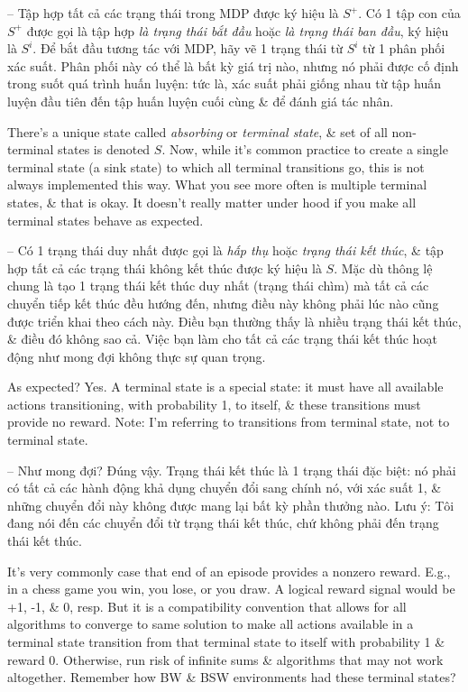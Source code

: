 \documentclass{article}
\begin{document}
\begin{itemize}
\begin{itemize}
        -- Tập hợp tất cả các trạng thái trong MDP được ký hiệu là $S^+$. Có 1 tập con của $S^+$ được gọi là tập hợp {\it là trạng thái bắt đầu} hoặc {\it là trạng thái ban đầu}, ký hiệu là $S^i$. Để bắt đầu tương tác với MDP, hãy vẽ 1 trạng thái từ $S^i$ từ 1 phân phối xác suất. Phân phối này có thể là bất kỳ giá trị nào, nhưng nó phải được cố định trong suốt quá trình huấn luyện: tức là, xác suất phải giống nhau từ tập huấn luyện đầu tiên đến tập huấn luyện cuối cùng \& để đánh giá tác nhân.

        There's a unique state called {\it absorbing} or {\it terminal state}, \& set of all non-terminal states is denoted $S$. Now, while it's common practice to create a single terminal state (a sink state) to which all terminal transitions go, this is not always implemented this way. What you see more often is multiple terminal states, \& that is okay. It doesn't really matter under hood if you make all terminal states behave as expected.

        -- Có 1 trạng thái duy nhất được gọi là {\it hấp thụ} hoặc {\it trạng thái kết thúc}, \& tập hợp tất cả các trạng thái không kết thúc được ký hiệu là $S$. Mặc dù thông lệ chung là tạo 1 trạng thái kết thúc duy nhất (trạng thái chìm) mà tất cả các chuyển tiếp kết thúc đều hướng đến, nhưng điều này không phải lúc nào cũng được triển khai theo cách này. Điều bạn thường thấy là nhiều trạng thái kết thúc, \& điều đó không sao cả. Việc bạn làm cho tất cả các trạng thái kết thúc hoạt động như mong đợi không thực sự quan trọng.

        As expected? Yes. A terminal state is a special state: it must have all available actions transitioning, with probability 1, to itself, \& these transitions must provide no reward. Note: I'm referring to transitions from terminal state, not to terminal state.

        -- Như mong đợi? Đúng vậy. Trạng thái kết thúc là 1 trạng thái đặc biệt: nó phải có tất cả các hành động khả dụng chuyển đổi sang chính nó, với xác suất 1, \& những chuyển đổi này không được mang lại bất kỳ phần thưởng nào. Lưu ý: Tôi đang nói đến các chuyển đổi từ trạng thái kết thúc, chứ không phải đến trạng thái kết thúc.

        It's very commonly case that end of an episode provides a nonzero reward. E.g., in a chess game you win, you lose, or you draw. A logical reward signal would be +1, -1, \& 0, resp. But it is a compatibility convention that allows for all algorithms to converge to same solution to make all actions available in a terminal state transition from that terminal state to itself with probability 1 \& reward 0. Otherwise, run risk of infinite sums \& algorithms that may not work altogether. Remember how BW \& BSW environments had these terminal states?


\end{itemize}
\end{itemize}
\end{document}
